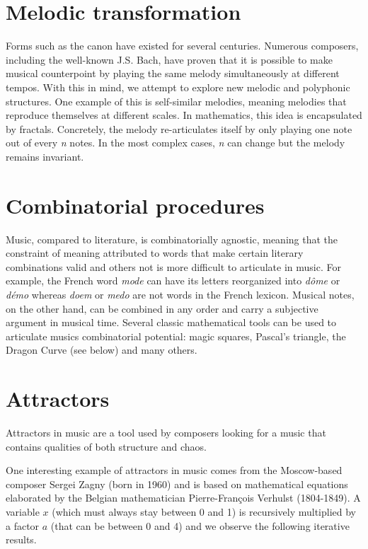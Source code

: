 \documentclass{article}
\begin{document}
\section*{Melodic transformation}
Forms such as the canon have existed for several centuries.  Numerous
composers, including the well-known J.S. Bach, have proven that it is
possible to make musical counterpoint by playing the same melody
simultaneously at different tempos.  With this in mind, we attempt to
explore new melodic and polyphonic structures.  One example of this is
self-similar melodies, meaning melodies that reproduce themselves at
different scales.  In mathematics, this idea is encapsulated by fractals. 
Concretely, the melody re-articulates itself by only playing one note out of
every \emph{n} notes.  In the most complex cases, \emph{n} can change but
the melody remains invariant.
\section*{Combinatorial procedures}
Music, compared to literature, is combinatorially agnostic, meaning that
the constraint of meaning attributed to words that make certain literary
combinations valid and others not is more difficult to articulate in music. 
For example, the French word \emph{mode} can have its letters reorganized
into \emph{d\^{o}me} or \emph{d\'{e}mo} whereas \emph{doem} or \emph{medo}
are not words in the French lexicon.  Musical notes, on the other hand, can
be combined in any order and carry a subjective argument in musical time.
Several classic mathematical tools can be used to articulate musics
combinatorial potential: magic squares, Pascal's triangle, the Dragon
Curve (see below) and many others.
\section*{Attractors}
Attractors in music are a tool used by composers looking for a music that
contains qualities of both structure and chaos.

One interesting example of attractors in music comes from the Moscow-based
composer Sergei Zagny (born in 1960) and is based on mathematical equations
elaborated by the Belgian mathematician Pierre-Fran\c{c}ois Verhulst
(1804-1849). A variable $x$ (which must always stay between 0 and 1) is
recursively multiplied by a factor $a$ (that can be between 0 and 4) and we
observe the following iterative results.
\end{document}

